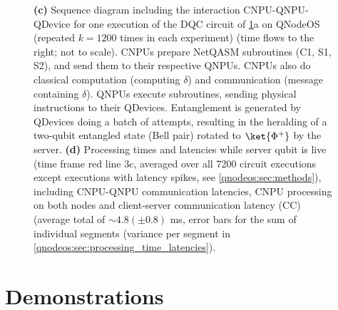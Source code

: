 \begin{figure}[htbp]
{\textbf{(c)} Sequence diagram including the interaction CNPU-QNPU-QDevice for one execution of the DQC circuit of \cref{qnodeos:fig:fig3}a on QNodeOS (repeated $k=1200$ times in each experiment) (time flows to the right; not to scale). CNPUs prepare NetQASM subroutines (C1, S1, S2), and send them to their respective QNPUs. CNPUs also do classical computation (computing $\delta$) and communication (message containing $\delta$). QNPUs execute subroutines, sending physical instructions to their QDevices. Entanglement is generated by QDevices doing a batch of attempts, resulting in the heralding of a two-qubit entangled state (Bell pair) rotated to $\ket{\Phi^+}$ by the server.
\textbf{(d)} Processing times and latencies while server qubit is live (time frame red line 3c, averaged over all 7200 circuit executions except executions with latency spikes, see \cref{qnodeos:sec:methods}), including CNPU-QNPU communication latencies, CNPU processing on both nodes and client-server communication latency (CC) (average total of $\sim 4.8 (\pm 0.8)$ ms, error bars for the sum of individual segments (variance per segment in \cref{qnodeos:sec:processing_time_latencies}).}
\label{qnodeos:fig:fig3}
\end{figure}


\section{Demonstrations}
